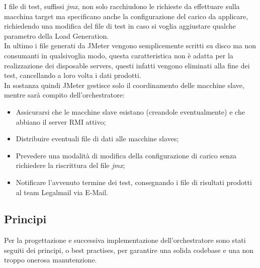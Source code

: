 I file di test, suffissi \textit{jmx}, non solo racchiudono le richieste da effettuare sulla macchina target ma specificano anche la configurazione del carico da applicare, richiedendo una modifica del file di test in caso si voglia aggiustare qualche parametro della Load Generation. \\
In ultimo i file generati da JMeter vengono semplicemente scritti su disco ma non consumanti in qualsivoglia modo, questa caratteristica non è adatta per la realizzazione dei disposable servers, questi infatti vengono eliminati alla fine dei test, cancellando a loro volta i dati prodotti. \\
In sostanza quindi JMeter gestisce solo il coordinamento delle macchine slave, mentre sarà compito dell'orchestratore:
\begin{itemize}
	\item Assicurarsi che le macchine slave esistano (creandole eventualmente) e che abbiano il server RMI attivo;
	\item Distribuire eventuali file di dati alle macchine slaves;
	\item Prevedere una modalità di modifica della configurazione di carico senza richiedere la riscrittura del file \textit{jmx};
	\item Notificare l'avvenuto termine dei test, consegnando i file di risultati prodotti al team Legalmail via E-Mail.
\end{itemize}
\subsection{Principi}
Per la progettazione e successiva implementazione dell'orchestratore sono stati seguiti dei principi, o best practises, per garantire una solida codebase e una non troppo onerosa manutenzione.
